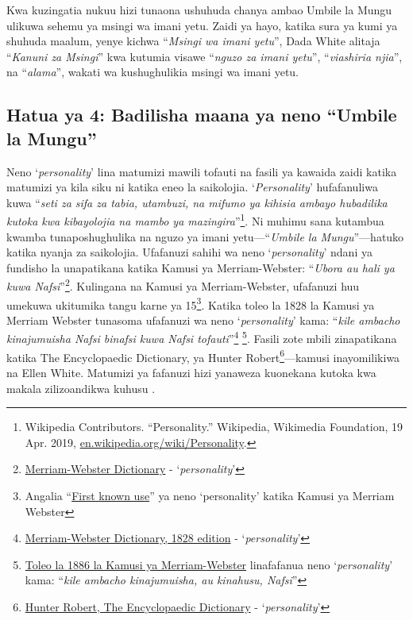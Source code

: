 Kwa kuzingatia nukuu hizi tunaona ushuhuda chanya ambao Umbile la Mungu ulikuwa sehemu ya msingi wa imani yetu. Zaidi ya hayo, katika sura ya kumi ya shuhuda maalum, yenye kichwa “\textit{Msingi wa imani yetu}”, Dada White alitaja “\textit{Kanuni za Msingi}” kwa kutumia visawe “\textit{nguzo za imani yetu}”, “\textit{viashiria njia}”, na “\textit{alama}”, wakati wa kushughulikia msingi wa imani yetu.



\subsection*{Hatua ya 4: Badilisha maana ya neno “Umbile la Mungu”}


Neno ‘\textit{personality}’ lina matumizi mawili tofauti na fasili ya kawaida zaidi katika matumizi ya kila siku ni katika eneo la saikolojia. ‘\textit{Personality}’ hufafanuliwa kuwa “\textit{seti za sifa za tabia, utambuzi, na mifumo ya kihisia ambayo hubadilika kutoka kwa kibayolojia na mambo ya mazingira}”\footnote{Wikipedia Contributors. “Personality.” Wikipedia, Wikimedia Foundation, 19 Apr. 2019, \href{https://en.wikipedia.org/wiki/Personality}{en.wikipedia.org/wiki/Personality}.}. Ni muhimu sana kutambua kwamba tunaposhughulika na nguzo ya imani yetu—“\textit{Umbile la Mungu}”—hatuko katika nyanja za saikolojia. Ufafanuzi sahihi wa neno ‘\textit{personality}’ ndani ya fundisho la  unapatikana katika Kamusi ya Merriam-Webster: “\textit{Ubora au hali ya kuwa Nafsi}”\footnote{\href{https://www.merriam-webster.com/dictionary/personality}{Merriam-Webster Dictionary} - ‘\textit{personality}’}. Kulingana na Kamusi ya Merriam-Webster, ufafanuzi huu umekuwa ukitumika tangu karne ya 15\footnote{Angalia “\href{https://www.merriam-webster.com/dictionary/personality\#word-history}{First known use}” ya neno ‘personality’ katika Kamusi ya Merriam Webster}. Katika toleo la 1828 la Kamusi ya Merriam Webster tunasoma ufafanuzi wa neno ‘\textit{personality}’ kama: “\textit{kile ambacho kinajumuisha Nafsi binafsi kuwa Nafsi tofauti}”\footnote{\href{https://archive.org/details/americandictiona02websrich/page/272/mode/2up}{Merriam-Webster Dictionary, 1828 edition} - ‘\textit{personality}’} \footnote{\href{https://archive.org/details/websterscomplete00webs/page/974/mode/2up}{Toleo la 1886 la Kamusi ya Merriam-Webster} linafafanua neno ‘\textit{personality}’ kama: “\textit{kile ambacho kinajumuisha, au kinahusu, Nafsi}”}. Fasili zote mbili zinapatikana katika The Encyclopaedic Dictionary, ya Hunter Robert\footnote{\href{https://babel.hathitrust.org/cgi/pt?id=mdp.39015050663213&view=1up&seq=780}{Hunter Robert, The Encyclopaedic Dictionary} - ‘\textit{personality}’}—kamusi inayomilikiwa na Ellen White. Matumizi ya fafanuzi hizi yanaweza kuonekana kutoka kwa makala zilizoandikwa kuhusu .


